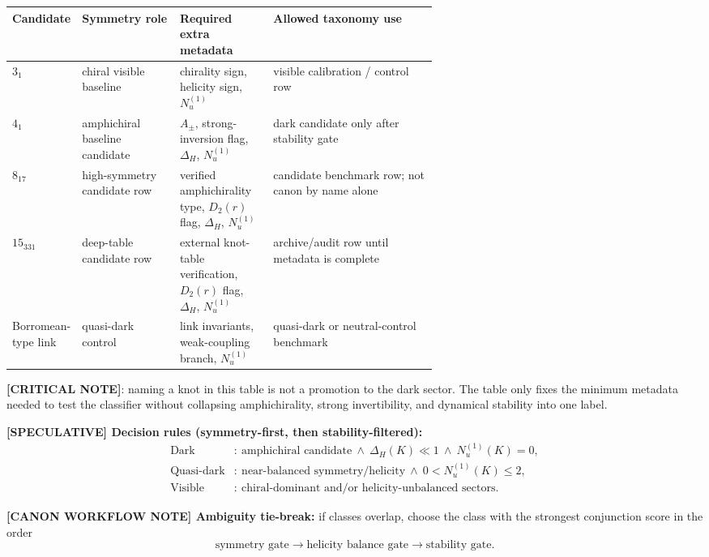\begin{center}
\begin{tabularx}{\linewidth}{p{0.16\linewidth}p{0.23\linewidth}p{0.22\linewidth}X}
\hline
Candidate & Symmetry role & Required extra metadata & Allowed taxonomy use \\
\hline
$3_1$ & chiral visible baseline & chirality sign, helicity sign, $N_u^{(1)}$ & visible calibration / control row \\
$4_1$ & amphichiral baseline candidate & $A_{\pm}$, strong-inversion flag, $\Delta_H$, $N_u^{(1)}$ & dark candidate only after stability gate \\
$8_{17}$ & high-symmetry candidate row & verified amphichirality type, $D_2(r)$ flag, $\Delta_H$, $N_u^{(1)}$ & candidate benchmark row; not canon by name alone \\
$15_{331}$ & deep-table candidate row & external knot-table verification, $D_2(r)$ flag, $\Delta_H$, $N_u^{(1)}$ & archive/audit row until metadata is complete \\
Borromean-type link & quasi-dark control & link invariants, weak-coupling branch, $N_u^{(1)}$ & quasi-dark or neutral-control benchmark \\
\hline
\end{tabularx}
\end{center}

\textbf{[CRITICAL NOTE]}: naming a knot in this table is not a promotion to the dark sector.  The table only fixes the minimum metadata needed to test the classifier without collapsing amphichirality, strong invertibility, and dynamical stability into one label.

\textbf{[SPECULATIVE] Decision rules (symmetry-first, then stability-filtered):}
\begin{align}
    \text{Dark}
    &:\ \text{amphichiral candidate}
    \ \wedge\
    \Delta_H(K)\ll 1
    \ \wedge\
    N_u^{(1)}(K)=0,\\
    \text{Quasi-dark}
    &:\ \text{near-balanced symmetry/helicity}
    \ \wedge\
    0 < N_u^{(1)}(K)\le 2,\\
    \text{Visible}
    &:\ \text{chiral-dominant and/or helicity-unbalanced sectors}.
\end{align}

\textbf{[CANON WORKFLOW NOTE] Ambiguity tie-break:}
if classes overlap, choose the class with the strongest conjunction score in the order
\[
\text{symmetry gate} \rightarrow \text{helicity balance gate} \rightarrow \text{stability gate}.
\]


